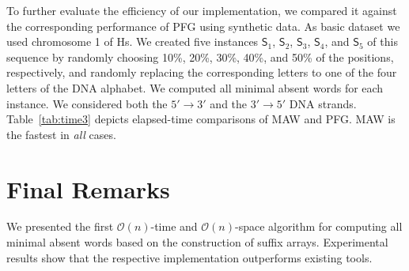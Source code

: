 \documentclass{llncs}
\newcommand{\cO}{\mathcal{O}}
\begin{document}
  To further evaluate the efficiency of our implementation, we compared
it against the corresponding performance of \textsf{PFG} using synthetic
data.
  As basic dataset we used chromosome 1 of Hs. 
  We created five instances $\textsf{S}_{1}$, $\textsf{S}_{2}$, 
$\textsf{S}_{3}$, $\textsf{S}_{4}$, and $\textsf{S}_{5}$ of this
sequence by randomly choosing 10\%, 20\%, 30\%, 40\%, and 50\% of 
the positions, respectively, and randomly replacing the corresponding
letters to one of the four letters of the DNA alphabet.
  We computed all minimal absent words for each instance. 
  We considered both the $5'\rightarrow3'$ and the $3'\rightarrow5'$ 
DNA strands.
  Table~\ref{tab:time3} depicts elapsed-time comparisons of 
\textsf{MAW} and \textsf{PFG}.
  \textsf{MAW} is the fastest in {\em all} cases.

\begin{table}[!ht]
\vspace{0.25cm}
\begin{center}
\end{center}
\caption{Elapsed-time comparison of \textsf{MAW} and \textsf{PFG}
for computing all minimal absent words in synthetic data}
\label{tab:time3}
\end{table}
\section{Final Remarks}
\label{sec:conc}
  We presented the first $\cO(n)$-time and $\cO(n)$-space algorithm for computing all minimal absent words based on the construction of suffix arrays. 
  Experimental results show that the respective implementation outperforms existing tools.


\end{document}
